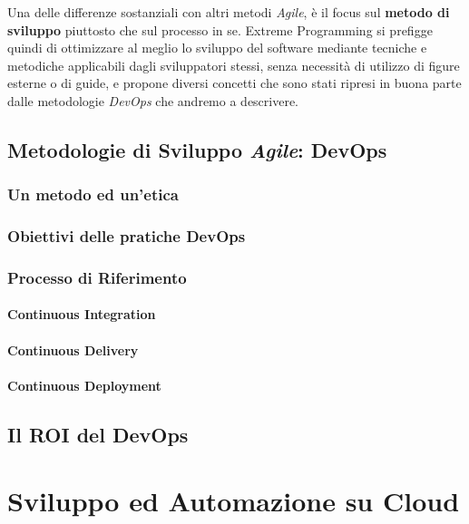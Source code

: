 \documentclass[a4paper,12pt]{report}
\begin{document}
			Una delle differenze sostanziali con altri metodi \emph{Agile}, è il focus sul \textbf{metodo di sviluppo} piuttosto che
			sul processo in se. Extreme Programming si prefigge quindi di ottimizzare al meglio lo sviluppo del software mediante 
			tecniche e metodiche applicabili dagli sviluppatori stessi, senza necessità di utilizzo di figure esterne o di guide,
			e propone diversi concetti che sono stati ripresi in buona parte dalle metodologie \emph{DevOps} che andremo a descrivere.
	
		\section{Metodologie di Sviluppo \emph{Agile}: DevOps}
	
			\subsection{Un metodo ed un'etica}
			
			\subsection{Obiettivi delle pratiche DevOps}
			
			\subsection{Processo di Riferimento}
	
				\subsubsection{Continuous Integration}
				
				\subsubsection{Continuous Delivery}
				
				\subsubsection{Continuous Deployment}
	
		\section{Il ROI del DevOps}
	
	\chapter{Sviluppo ed Automazione su Cloud}
	
\end{document}

